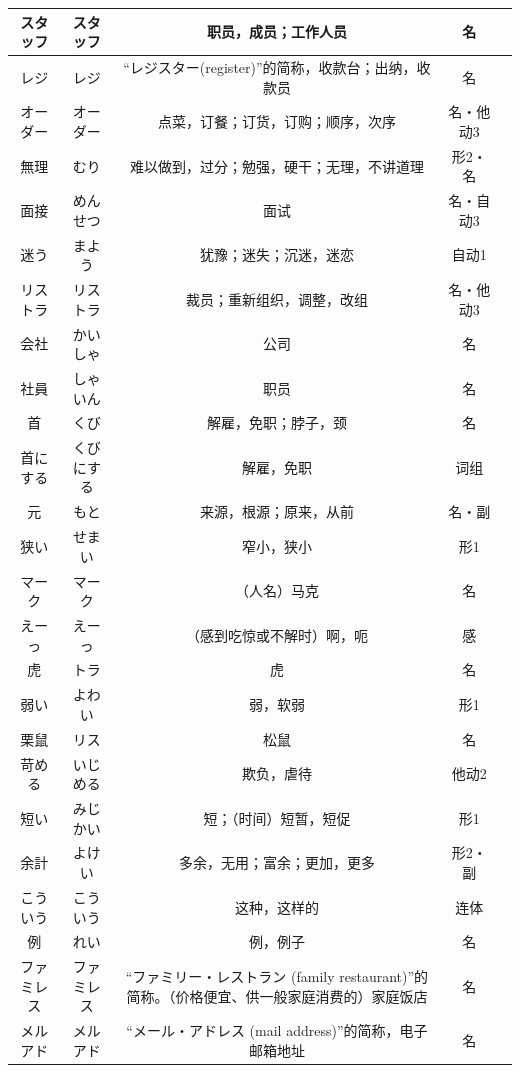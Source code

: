 \begin{longtable}{|c|c|c|c|c|}
スタッフ & スタッフ & 职员，成员；工作人员 & 名 &  \\ \hline
レジ & レジ & “レジスター(register)”的简称，收款台；出纳，收款员 & 名 &  \\ \hline
オーダー & オーダー & 点菜，订餐；订货，订购；顺序，次序 & 名・他动3 &  \\ \hline
無理 & むり & 难以做到，过分；勉强，硬干；无理，不讲道理 & 形2・名 &  \\ \hline
面接 & めんせつ & 面试 & 名・自动3 &  \\ \hline
迷う & まよう & 犹豫；迷失；沉迷，迷恋 & 自动1 &  \\ \hline
リストラ & リストラ & 裁员；重新组织，调整，改组 & 名・他动3 &  \\ \hline
会社 & かいしゃ & 公司 & 名 &  \\ \hline
社員 & しゃいん & 职员 & 名 &  \\ \hline
首 & くび & 解雇，免职；脖子，颈 & 名 &  \\ \hline
首にする & くびにする & 解雇，免职 & 词组 &  \\ \hline
元 & もと & 来源，根源；原来，从前 & 名・副 &  \\ \hline
狭い & せまい & 窄小，狭小 & 形1 &  \\ \hline
マーク & マーク & （人名）马克 & 名 &  \\ \hline
えーっ & えーっ & （感到吃惊或不解时）啊，呃 & 感 &  \\ \hline
虎 & トラ & 虎 & 名 &  \\ \hline
弱い & よわい & 弱，软弱 & 形1 &  \\ \hline
栗鼠 & リス & 松鼠 & 名 &  \\ \hline
苛める & いじめる & 欺负，虐待 & 他动2 &  \\ \hline
短い & みじかい & 短；（时间）短暂，短促 & 形1 &  \\ \hline
余計 & よけい & 多余，无用；富余；更加，更多 & 形2・副 &  \\ \hline
こういう & こういう & 这种，这样的 & 连体 &  \\ \hline
例 & れい & 例，例子 & 名 &  \\ \hline
ファミレス & ファミレス & “ファミリー・レストラン (family restaurant)”的简称。（价格便宜、供一般家庭消费的）家庭饭店 & 名 &  \\ \hline
メルアド & メルアド & “メール・アドレス (mail address)”的简称，电子邮箱地址 & 名 &  \\ \hline
\end{longtable}

